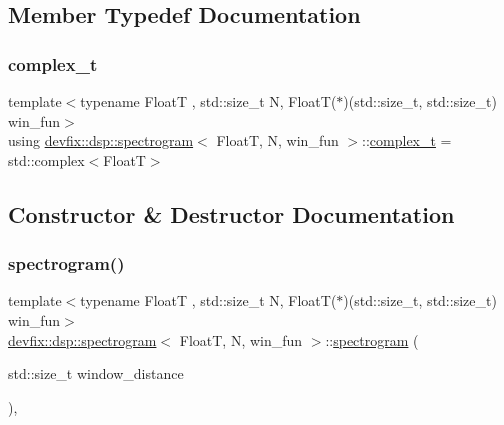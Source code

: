\subsection{Member Typedef Documentation}
\mbox{\label{structdevfix_1_1dsp_1_1spectrogram_a920fdda446509cfe81fa287773c709cb}} 
\subsubsection{\texorpdfstring{complex\+\_\+t}{complex\_t}}
{\footnotesize\ttfamily template$<$typename FloatT , std\+::size\+\_\+t N, Float\+T($\ast$)(std\+::size\+\_\+t, std\+::size\+\_\+t) win\+\_\+fun$>$ \\
using \hyperlink{structdevfix_1_1dsp_1_1spectrogram}{devfix\+::dsp\+::spectrogram}$<$ FloatT, N, win\+\_\+fun $>$\+::\hyperlink{structdevfix_1_1dsp_1_1spectrogram_a920fdda446509cfe81fa287773c709cb}{complex\+\_\+t} =  std\+::complex$<$FloatT$>$}



\subsection{Constructor \& Destructor Documentation}
\mbox{\label{structdevfix_1_1dsp_1_1spectrogram_ad1d11586447533319ec37e5e9de6e6e9}} 
\subsubsection{\texorpdfstring{spectrogram()}{spectrogram()}}
{\footnotesize\ttfamily template$<$typename FloatT , std\+::size\+\_\+t N, Float\+T($\ast$)(std\+::size\+\_\+t, std\+::size\+\_\+t) win\+\_\+fun$>$ \\
\hyperlink{structdevfix_1_1dsp_1_1spectrogram}{devfix\+::dsp\+::spectrogram}$<$ FloatT, N, win\+\_\+fun $>$\+::\hyperlink{structdevfix_1_1dsp_1_1spectrogram}{spectrogram} (\begin{DoxyParamCaption}\item[{std\+::size\+\_\+t}]{window\+\_\+distance }\end{DoxyParamCaption})\hspace{0.3cm}{\ttfamily [inline]}, {\ttfamily [explicit]}}



